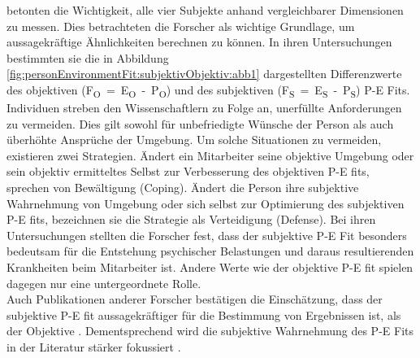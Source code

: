 \textcite{copingAndAdaption:1974} betonten die Wichtigkeit, alle vier Subjekte anhand vergleichbarer Dimensionen zu messen. Dies betrachteten die Forscher als wichtige Grundlage, um aussagekräftige Ähnlichkeiten berechnen zu können. In ihren Untersuchungen bestimmten sie die in Abbildung \ref{fig:personEnvironmentFit:subjektivObjektiv:abb1} dargestellten Differenzwerte des objektiven \mbox{(F\textsubscript{O} = E\textsubscript{O} - P\textsubscript{O})} und des subjektiven \mbox{(F\textsubscript{S} = E\textsubscript{S} - P\textsubscript{S})} P-E Fits. Individuen streben den Wissenschaftlern zu Folge an, unerfüllte Anforderungen zu vermeiden. Dies gilt sowohl für unbefriedigte Wünsche der Person als auch überhöhte Ansprüche der Umgebung. Um solche Situationen zu vermeiden, existieren zwei Strategien. Ändert ein Mitarbeiter seine objektive Umgebung oder sein objektiv ermitteltes Selbst zur Verbesserung des objektiven P-E fits, sprechen \textcite{copingAndAdaption:1974} von Bewältigung (Coping). Ändert die Person ihre subjektive Wahrnehmung von Umgebung oder sich selbst zur Optimierung des subjektiven P-E fits, bezeichnen sie die Strategie als Verteidigung (Defense). Bei ihren Untersuchungen stellten die Forscher fest, dass der subjektive P-E Fit besonders bedeutsam für die Entstehung psychischer Belastungen und daraus resultierenden Krankheiten beim Mitarbeiter ist. Andere Werte wie der objektive P-E fit spielen dagegen nur eine untergeordnete Rolle. \\
Auch Publikationen anderer Forscher bestätigen die Einschätzung, dass der subjektive P-E fit aussagekräftiger für die Bestimmung von Ergebnissen ist, als der Objektive \cite[S. 3]{carless:2005}. Dementsprechend wird die subjektive Wahrnehmung des P-E Fits in der Literatur stärker fokussiert \cite[S. 8]{caplan:1987}\cite[S. 9]{caplan:1993}\cite[S. 16]{choi:2004}.\\
